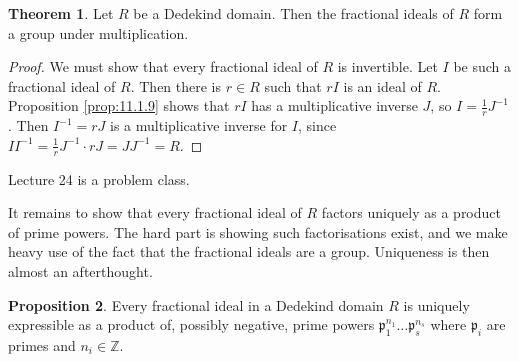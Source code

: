 \documentclass{article}
\newcommand{\Z}{\mathbb{Z}}
\theoremstyle{definition}\newtheorem{definition}{Definition}[subsection]
\theoremstyle{definition}\newtheorem{remark}[definition]{Remark}
\theoremstyle{definition}\newtheorem*{example}{Example}
\theoremstyle{definition}\newtheorem*{note}{Note}
\newtheorem{proposition}[definition]{Proposition}
\newtheorem{theorem}[definition]{Theorem}
\begin{document}
\begin{theorem}
Let $ R $ be a Dedekind domain. Then the fractional ideals of $ R $ form a group under multiplication.
\end{theorem}

\begin{proof}
We must show that every fractional ideal of $ R $ is invertible. Let $ I $ be such a fractional ideal of $ R $. Then there is $ r \in R $ such that $ rI $ is an ideal of $ R $. Proposition \ref{prop:11.1.9} shows that $ rI $ has a multiplicative inverse $ J $, so $ I = \tfrac{1}{r}J^{-1} $. Then $ I^{-1} = rJ $ is a multiplicative inverse for $ I $, since $ II^{-1} = \tfrac{1}{r}J^{-1} \cdot rJ = JJ^{-1} = R $.
\end{proof}


Lecture 24 is a problem class.


It remains to show that every fractional ideal of $ R $ factors uniquely as a product of prime powers. The hard part is showing such factorisations exist, and we make heavy use of the fact that the fractional ideals are a group. Uniqueness is then almost an afterthought.

\begin{proposition}
Every fractional ideal in a Dedekind domain $ R $ is uniquely expressible as a product of, possibly negative, prime powers $ \mathfrak{p}_1^{n_1} \dots \mathfrak{p}_s^{n_s} $ where $ \mathfrak{p}_i $ are primes and $ n_i \in \Z $.
\end{proposition}
\end{document}
